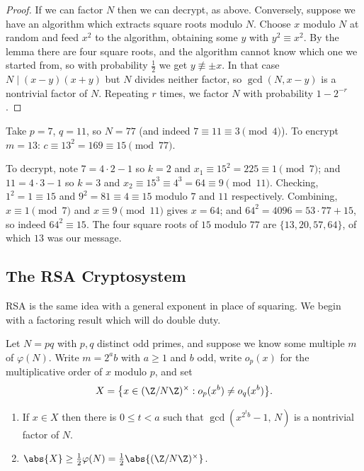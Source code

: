 \begin{proof}
	If we can factor $N$ then we can decrypt, as above. Conversely, suppose we have an algorithm which extracts square roots modulo $N$. Choose $x$ modulo $N$ at random and feed $x^2$ to the algorithm, obtaining some $y$ with $y^2\equiv x^2$. By the lemma there are four square roots, and the algorithm cannot know which one we started from, so with probability $\tfrac12$ we get $y\not\equiv\pm x$. In that case $N \mid (x-y)(x+y)$ but $N$ divides neither factor, so $\gcd(N,x-y)$ is a nontrivial factor of $N$. Repeating $r$ times, we factor $N$ with probability $1-2^{-r}$.
\end{proof}

\begin{example}
	Take $p = 7$, $q = 11$, so $N = 77$ (and indeed $7 \equiv 11\equiv3\pmod4$). To encrypt $m = 13$: $c \equiv 13^2 = 169 \equiv 15 \pmod{77}$.

	To decrypt, note $7 = 4\cdot2-1$ so $k = 2$ and $x_1 \equiv 15^2 = 225\equiv1\pmod7$; and $11 = 4\cdot3-1$ so $k=3$ and $x_2\equiv15^3\equiv4^3=64\equiv9\pmod{11}$. Checking, $1^2 = 1 \equiv 15$ and $9^2 = 81\equiv4\equiv15$ modulo $7$ and $11$ respectively. Combining, $x \equiv 1\pmod 7$ and $x\equiv9\pmod{11}$ gives $x = 64$; and $64^2 = 4096 = 53\cdot77+15$, so indeed $64^2\equiv15$. The four square roots of $15$ modulo $77$ are $\{13,20,57,64\}$, of which $13$ was our message.
\end{example}

\subsection{The RSA Cryptosystem}

RSA is the same idea with a general exponent in place of squaring. We begin with a factoring result which will do double duty.

Let $N = pq$ with $p,q$ distinct odd primes, and suppose we know some multiple $m$ of $\varphi(N)$. Write $m = 2^ab$ with $a \ge 1$ and $b$ odd, write $o_p(x)$ for the multiplicative order of $x$ modulo $p$, and set
$$X = \bigl\{x \in (\Z/N\Z)^\times : o_p(x^b)\ne o_q(x^b)\bigr\}.$$

\begin{theorem}\label{thm:factorfromphi}
	\begin{enumerate}[label=(\roman*)]
		\item If $x \in X$ then there is $0 \le t<a$ such that $\gcd(x^{2^tb}-1,\,N)$ is a nontrivial factor of $N$.
		\item $\abs{X}\ge\tfrac12\varphi(N) = \tfrac12\abs{(\Z/N\Z)^\times}$.
	\end{enumerate}
\end{theorem}

